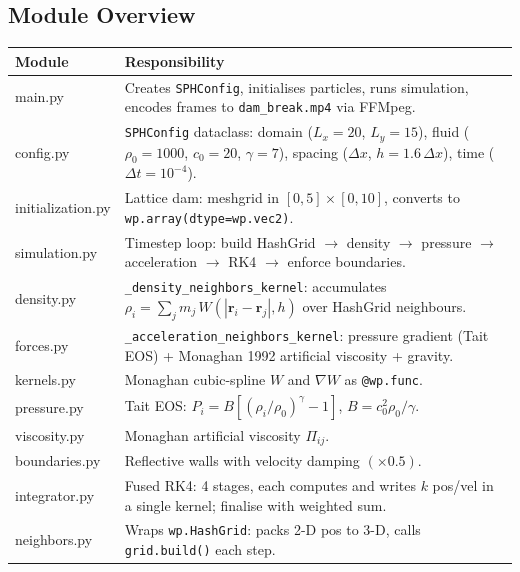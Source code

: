 \documentclass[11pt,a4paper]{article}
\begin{document}
\subsection{Module Overview}

\begin{tabularx}{\linewidth}{>{\ttfamily}lX}
  \toprule
  \textbf{Module} & \textbf{Responsibility} \\
  \midrule
  main.py          & Creates \texttt{SPHConfig}, initialises particles, runs simulation,
                     encodes frames to \texttt{dam\_break.mp4} via FFMpeg. \\
  config.py        & \texttt{SPHConfig} dataclass: domain ($L_x{=}20$, $L_y{=}15$),
                     fluid ($\rho_0{=}1000$, $c_0{=}20$, $\gamma{=}7$), spacing
                     ($\Delta x$, $h{=}1.6\,\Delta x$), time ($\Delta t{=}10^{-4}$). \\
  initialization.py& Lattice dam: meshgrid in $[0,5]\times[0,10]$, converts to
                     \texttt{wp.array(dtype=wp.vec2)}. \\
  simulation.py    & Timestep loop: build HashGrid $\to$ density $\to$ pressure $\to$
                     acceleration $\to$ RK4 $\to$ enforce boundaries. \\
  density.py       & \texttt{\_density\_neighbors\_kernel}: accumulates
                     $\rho_i = \sum_j m_j\,W(|\mathbf{r}_i - \mathbf{r}_j|, h)$
                     over HashGrid neighbours. \\
  forces.py        & \texttt{\_acceleration\_neighbors\_kernel}: pressure gradient
                     (Tait EOS) + Monaghan 1992 artificial viscosity + gravity. \\
  kernels.py       & Monaghan cubic-spline $W$ and $\nabla W$ as \texttt{@wp.func}. \\
  pressure.py      & Tait EOS: $P_i = B\!\left[(\rho_i/\rho_0)^\gamma - 1\right]$,
                     $B = c_0^2\rho_0/\gamma$. \\
  viscosity.py     & Monaghan artificial viscosity $\Pi_{ij}$. \\
  boundaries.py    & Reflective walls with velocity damping $(\times 0.5)$. \\
  integrator.py    & Fused RK4: 4 stages, each computes and writes $k$ pos/vel
                     in a single kernel; finalise with weighted sum. \\
  neighbors.py     & Wraps \texttt{wp.HashGrid}: packs 2-D pos to 3-D, calls
                     \texttt{grid.build()} each step. \\
  \bottomrule
\end{tabularx}
\end{document}
